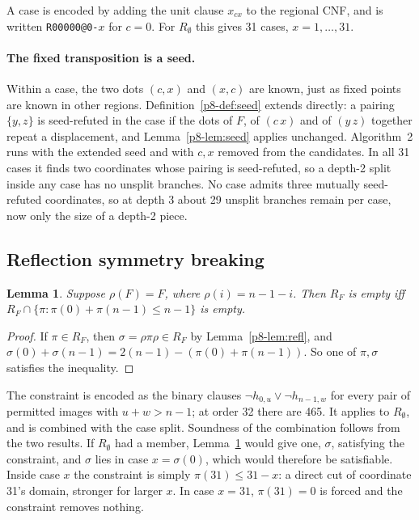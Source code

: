 \documentclass[11pt,a4paper,oneside]{report}
\newtheorem{lemma}[theorem]{Lemma}
\theoremstyle{definition}
\newcommand{\code}[1]{\texttt{#1}}
\begin{document}
A case is encoded by adding the unit clause $x_{cx}$ to the regional CNF, and is written
\code{R00000@0-}$x$ for $c=0$. For $R_\emptyset$ this gives 31 cases, $x=1,\dots,31$.

\paragraph{The fixed transposition is a seed.} Within a case, the two dots $(c,x)$ and $(x,c)$
are known, just as fixed points are known in other regions. Definition~\ref{p8-def:seed} extends
directly: a pairing $\{y,z\}$ is seed-refuted in the case if the dots of $F$, of $(c\,x)$ and of
$(y\,z)$ together repeat a displacement, and Lemma~\ref{p8-lem:seed} applies unchanged.
Algorithm~2 runs with the extended seed and with $c,x$ removed from the candidates. In all 31
cases it finds two coordinates whose pairing is seed-refuted, so a depth-2 split inside any
case has no unsplit branches. No case admits three mutually seed-refuted coordinates, so at
depth 3 about 29 unsplit branches remain per case, now only the size of a depth-2 piece.

\subsection{Reflection symmetry breaking}

\begin{lemma}\label{p8-lem:sb}
Suppose $\rho(F)=F$, where $\rho(i)=n-1-i$. Then $R_F$ is empty iff
$R_F\cap\{\pi:\pi(0)+\pi(n-1)\le n-1\}$ is empty.
\end{lemma}
\begin{proof}
If $\pi\in R_F$, then $\sigma=\rho\pi\rho\in R_F$ by Lemma~\ref{p8-lem:refl}, and
$\sigma(0)+\sigma(n-1)=2(n-1)-(\pi(0)+\pi(n-1))$. So one of $\pi,\sigma$ satisfies the
inequality.
\end{proof}

The constraint is encoded as the binary clauses $\neg h_{0,u}\vee\neg h_{n-1,w}$ for every
pair of permitted images with $u+w>n-1$; at order 32 there are 465. It applies to
$R_\emptyset$, and is combined with the case split. Soundness of the combination follows from
the two results. If $R_\emptyset$ had a member, Lemma~\ref{p8-lem:sb} would give one, $\sigma$,
satisfying the constraint, and $\sigma$ lies in case $x=\sigma(0)$, which would therefore be
satisfiable. Inside case $x$ the constraint is simply $\pi(31)\le31-x$: a direct cut of
coordinate 31's domain, stronger for larger $x$. In case $x=31$, $\pi(31)=0$ is forced and the
constraint removes nothing.
\end{document}
